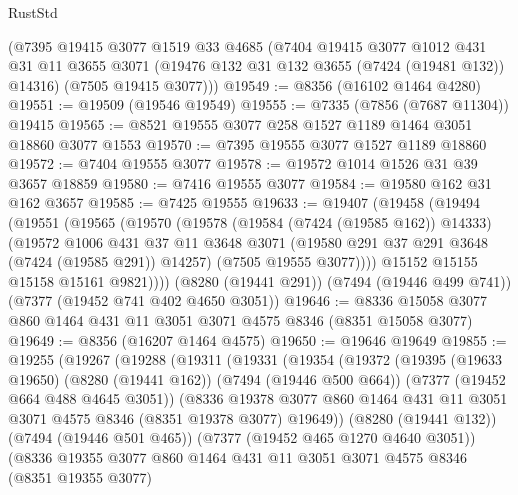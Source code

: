 \begin{lexlean}{RustStd}
\begin{coremodule}
    (@7395
      @19415
      @3077
      @1519
      @33
      @4685
      (@7404
        @19415
        @3077
        @1012
        @431
        @31
        @11
        @3655
        @3071
        (@19476 @132 @31 @132 @3655 (@7424 (@19481 @132)) @14316)
        (@7505 @19415 @3077)))
@19549 := @8356 (@16102 @1464 @4280)
@19551 := @19509 (@19546 @19549)
@19555 := @7335 (@7856 (@7687 @11304)) @19415
@19565 := @8521 @19555 @3077 @258 @1527 @1189 @1464 @3051 @18860 @3077 @1553
@19570 := @7395 @19555 @3077 @1527 @1189 @18860
@19572 := @7404 @19555 @3077
@19578 := @19572 @1014 @1526 @31 @39 @3657 @18859
@19580 := @7416 @19555 @3077
@19584 := @19580 @162 @31 @162 @3657
@19585 := @7425 @19555
@19633 := @19407
    (@19458
      (@19494
        (@19551
          (@19565
            (@19570
              (@19578
                (@19584 (@7424 (@19585 @162)) @14333)
                (@19572
                  @1006
                  @431
                  @37
                  @11
                  @3648
                  @3071
                  (@19580 @291 @37 @291 @3648 (@7424 (@19585 @291)) @14257)
                  (@7505 @19555 @3077))))
            @15152
            @15155
            @15158
            @15161
            @9821))))
    (@8280 (@19441 @291))
    (@7494 (@19446 @499 @741))
    (@7377 (@19452 @741 @402 @4650 @3051))
@19646 := @8336 @15058 @3077 @860 @1464 @431 @11 @3051 @3071 @4575 @8346 (@8351 @15058 @3077)
@19649 := @8356 (@16207 @1464 @4575)
@19650 := @19646 @19649
@19855 := @19255
    (@19267
      (@19288
        (@19311
          (@19331
            (@19354
              (@19372
                (@19395
                  (@19633 @19650)
                  (@8280 (@19441 @162))
                  (@7494 (@19446 @500 @664))
                  (@7377 (@19452 @664 @488 @4645 @3051))
                  (@8336
                    @19378
                    @3077
                    @860
                    @1464
                    @431
                    @11
                    @3051
                    @3071
                    @4575
                    @8346
                    (@8351 @19378 @3077)
                    @19649))
                (@8280 (@19441 @132))
                (@7494 (@19446 @501 @465))
                (@7377 (@19452 @465 @1270 @4640 @3051))
                (@8336
                  @19355
                  @3077
                  @860
                  @1464
                  @431
                  @11
                  @3051
                  @3071
                  @4575
                  @8346
                  (@8351 @19355 @3077)

\end{coremodule}
\end{lexlean}
